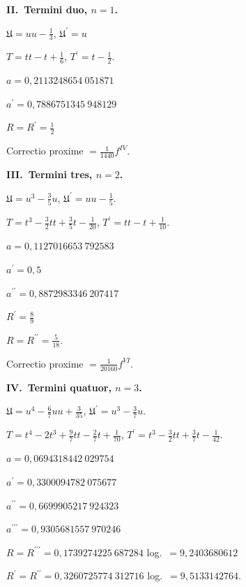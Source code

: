 \documentclass[12pt,a4paper]{article}
\newcommand{\UU}{\mathfrak{U}}
\begin{document}
\medskip

\textbf{II.\ Termini duo, $n = 1$.}

\medskip

$\UU = uu - \tfrac{1}{3}$, \quad $\UU^\prime = u$

$T = tt - t + \tfrac{1}{6}$, \quad $T^\prime = t - \tfrac{1}{2}$.

$a = 0{,}2113248654\ 051871$

$a^\prime = 0{,}7886751345\ 948129$

$R = R^\prime = \tfrac{1}{2}$

Correctio proxime $= \tfrac{1}{1440} f^{IV}$.

\medskip

\textbf{III.\ Termini tres, $n = 2$.}

\medskip

$\UU = u^3 - \tfrac{3}{5}u$, \quad $\UU^\prime = uu - \tfrac{1}{5}$.

$T = t^3 - \tfrac{3}{2}tt + \tfrac{3}{5}t - \tfrac{1}{20}$, \quad $T^\prime = tt - t + \tfrac{1}{10}$.

$a = 0{,}1127016653\ 792583$

$a^\prime = 0{,}5$

$a^{\prime\prime} = 0{,}8872983346\ 207417$

$R^\prime = \tfrac{8}{9}$

$R = R^{\prime\prime} = \tfrac{5}{18}$.

Correctio proxime $= \tfrac{1}{20160} f^{VI}$.

\medskip

\textbf{IV.\ Termini quatuor, $n = 3$.}

\medskip

$\UU = u^4 - \tfrac{6}{7}uu + \tfrac{3}{35}$, \quad $\UU^\prime = u^3 - \tfrac{3}{7}u$.

$T = t^4 - 2t^3 + \tfrac{9}{7}tt - \tfrac{2}{7}t + \tfrac{1}{70}$, \quad $T^\prime = t^3 - \tfrac{3}{2}tt + \tfrac{3}{7}t - \tfrac{1}{42}$.

$a = 0{,}0694318442\ 029754$

$a^\prime = 0{,}3300094782\ 075677$

$a^{\prime\prime} = 0{,}6699905217\ 924323$

$a^{\prime\prime\prime} = 0{,}9305681557\ 970246$

$R = R^{\prime\prime\prime} = 0{,}1739274225\ 687284$ \quad log.\ $= 9{,}2403680612$

$R^\prime = R^{\prime\prime} = 0{,}3260725774\ 312716$ \quad log.\ $= 9{,}5133142764$.
\end{document}
